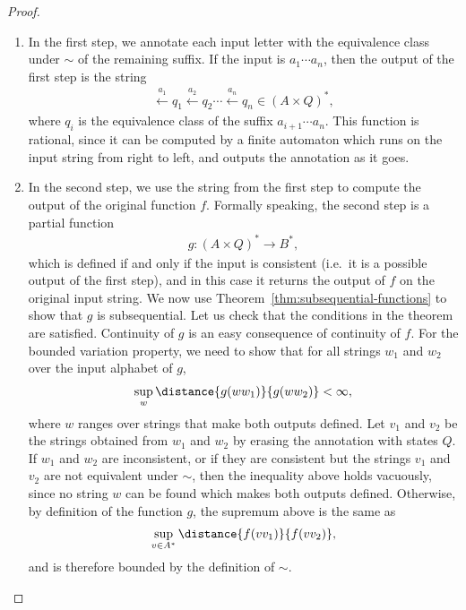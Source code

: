 \begin{proof}
\begin{enumerate}
    \item In the first step, we annotate each input letter with the equivalence class under $\sim$ of the remaining suffix. If the input is $a_1 \cdots a_n$, then the output of the first step is the string
\begin{align*}
\xleftarrow{a_1} q_1 \xleftarrow{a_2} q_2 \cdots \xleftarrow{a_n} q_n \in (A \times Q)^*,
\end{align*}
where $q_i$ is the equivalence class of the suffix $a_{i+1} \cdots a_n$. This function is rational, since it can be computed by a finite automaton which runs on the input string from right to left, and outputs the annotation as it goes.
    \item In the second step, we use the string from the first step to compute the output of the original function $f$. Formally speaking, the second step is a partial function 
    \begin{align*}
     g : (A \times Q)^* \to B^*,
    \end{align*}
    which is defined if and only if the input is consistent (i.e.~it is a possible output of the first step), and in this case it returns the output of $f$ on the original input string. We now use Theorem~\ref{thm:subsequential-functions} to show that $g$ is subsequential. Let us check that the conditions in the theorem are satisfied. Continuity of $g$ is an easy consequence of continuity of $f$. For the bounded variation property,  we need to show that  for all strings $w_1$ and $w_2$ over the input alphabet of $g$,
    \begin{align*}
    \sup_{w} \distance{g(ww_1)}{g(ww_2)} < \infty,
    \end{align*}
    where $w$ ranges over strings that make both outputs defined.
    Let $v_1$ and $v_2$ be the strings obtained from $w_1$ and $w_2$ by erasing the annotation with states $Q$. If $w_1$ and $w_2$ are inconsistent, or if they are consistent but the strings $v_1$ and $v_2$ are not equivalent under $\sim$, then the inequality above holds vacuously, since no string $w$ can be found which makes both outputs defined. Otherwise, by definition of the function $g$, the supremum above is the same as 
    \begin{align*}
    \sup_{v \in A^*} \distance{f(vv_1)}{f(vv_2)},
    \end{align*}
    and is therefore bounded by the definition of $\sim$.
\end{enumerate}

\end{proof}

